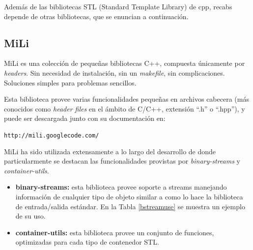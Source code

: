 Además de las bibliotecas STL (Standard Template Library) de cpp, recabs depende de otras bibliotecas, que se enuncian a continuación.

\subsection{MiLi}
\label{mili}

MiLi es una colección de pequeñas bibliotecas C++, compuesta únicamente por \textit{headers}. Sin necesidad de instalación, sin un
\textit{makefile}, sin complicaciones. Soluciones simples para problemas sencillos.

Esta biblioteca provee varias funcionalidades pequeñas en archivos cabecera (más conocidos como \textit{header files} en el ámbito de C/C++,
extensión ``.h'' o ``.hpp''), y puede ser descargada junto con su documentación en:
\begin{center}
    \texttt{http://mili.googlecode.com/}
\end{center}

MiLi ha sido utilizada extensamente a lo largo del desarrollo de  donde particularmente se destacan las funcionalidades provistas por
\textit{binary-streams} y \textit{container-utils}.

\begin{itemize}
    \item   \textbf{binary-streams:} esta biblioteca provee soporte a streams manejando información de cualquier tipo de objeto similar a
            como lo hace la biblioteca de entrada/salida estándar. En la Tabla \ref{bstreamuse} se muestra un ejemplo de su uso.
    \item   \textbf{container-utils:} esta biblioteca provee un conjunto de funciones, optimizadas para cada tipo de contenedor STL.
\end{itemize}

